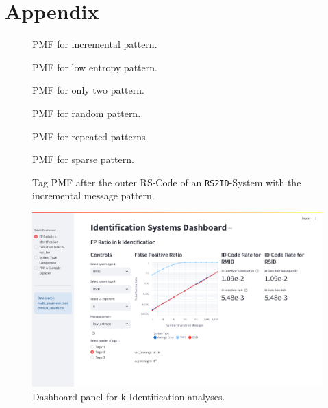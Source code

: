 \documentclass[english,BCOR=4mm,cdfont=false]{tudscrreprt} %
\begin{document}
\printbibliography


\appendix
\chapter{Appendix}

\begin{figure}[hp]
  \centering
  
  \caption{PMF for incremental pattern.}
  \label{fig:incremental}
\end{figure}

\begin{figure}[hp]
  \centering
  
  \caption{PMF for low entropy pattern.}
\end{figure}

\begin{figure}[hp]
  \centering
  
  \caption{PMF for only two pattern.}
\end{figure}

\begin{figure}[hp]
  \centering
  
  \caption{PMF for random pattern.}
\end{figure}

\begin{figure}[hp]
  \centering
  
  \caption{PMF for repeated patterns.}
\end{figure}

\begin{figure}[hp]
  \centering
  
  \caption{PMF for sparse pattern.}
\end{figure}

\begin{figure}[hp]
  \centering
  
  \caption{Tag PMF after the outer RS-Code of an \texttt{RS2ID}-System with the incremental message pattern.}
  \label{fig:rsid_16_pmf}
\end{figure}

\begin{figure}[hp]
  \centering
  \includegraphics[width=\textwidth]{images/k-identification_dash.pdf}
  \caption{Dashboard panel for k-Identification analyses.}
  \label{fig:dashKID}
\end{figure}
\end{document}
